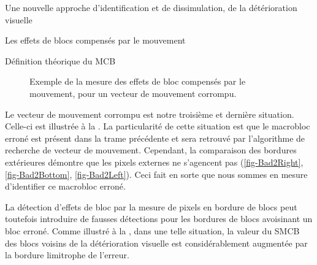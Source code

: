 \begin{chapter}{Une nouvelle approche d'identification et de dissimulation, de
la détérioration visuelle}
\begin{section}{Les effets de blocs compensés par le mouvement}
\begin{subsection}{Définition théorique du MCB}
\begin{figure}
{{			
		}
	}
	\caption[Exemple du MCB pour un vecteur de mouvement corrompu]{Exemple de la
mesure des effets de bloc compensés par le mouvement, pour un vecteur de
mouvement corrompu.}
	\label{fig-Bad2}
\end{figure}

Le vecteur de mouvement corrompu est notre troisième et dernière situation.
Celle-ci est illustrée à la . La particularité de cette situation
est que le macrobloc erroné est présent dans la trame précédente et sera
retrouvé par l'algorithme de recherche de vecteur de mouvement. Cependant, la
comparaison des bordures extérieures démontre que les pixels externes ne
s'agencent pas (\ref{fig-Bad2Right},
\ref{fig-Bad2Bottom}, \ref{fig-Bad2Left}). Ceci fait en sorte que nous
sommes en mesure d'identifier ce macrobloc erroné.

La détection d'effets de bloc par la mesure de pixels en bordure de blocs peut
toutefois introduire de fausses détections pour les bordures de blocs avoisinant
un bloc erroné. Comme illustré à la , dans une telle
situation, la valeur du SMCB des blocs voisins de la détérioration visuelle est
considérablement augmentée par la bordure limitrophe de l'erreur.


\end{subsection}
\end{section}
\end{chapter}
